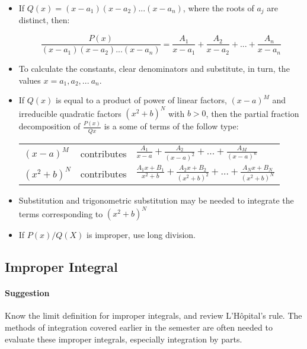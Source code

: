 \documentclass[11pt]{article}
\begin{document}
			\begin{itemize}
			
				\item If $Q(x) = (x - a_1)(x - a_2) ... (x - a_n)$, where the roots of $a_j$ are distinct, then:
				
				\begin{equation*}
					\frac{P(x)}{(x - a_1)(x - a_2) ... (x - a_n)} = \frac{A_1}{x - a_1} + \frac{A_2}{x - a_2} + ... + \frac{A_n}{x - a_n}
				\end{equation*}
				
				\item To calculate the constants, clear denominators and substitute, in turn, the values $x = a_1, a_2, ... \: a_n$.
				
				\item If $Q(x)$ is equal to a product of power of linear factors, $(x - a)^M$ and irreducible quadratic factors $(x^2 + b)^N$ with $b > 0$, then the partial fraction decomposition of $\frac{P(x)}{Q{x}}$ is a some of terms of the follow type:
				
\begin{table}[h]
			\begin{center}
				\begin{tabularx}{.9\textwidth}{X X X}
				$ (x - a)^M $ & contributes & $ \frac{A_1}{x - a} + \frac{A_2}{(x - a)^2} + ... + \frac{A_M}{(x - a)^n}  $ \\ 
				$ (x^2 + b)^N $ & contributes & $ \frac{A_1 x+ B_1}{x^2 + b} + \frac{A_2 x+ B_2}{(x^2 + b)^2} + ... + \frac{A_N x+ B_N}{(x^2 + b)^N}$ \\
				\end{tabularx}
			\label{ }
			\end{center}
			\end{table}
				
			\item Substitution and trigonometric substitution may be needed to integrate the terms corresponding to $(x^2 + b)^N$
			
			\item If $P(x)/Q(X)$ is improper, use long division.
				
			\end{itemize}
		
	\pagebreak
	\subsection{Improper Integral}
	
		\paragraph{Suggestion} Know the limit definition for improper integrals, and review L'H\^{o}pital's rule. The methods of integration covered earlier in the semester are often needed to evaluate these improper integrals, especially integration by parts.
		
\end{document}
